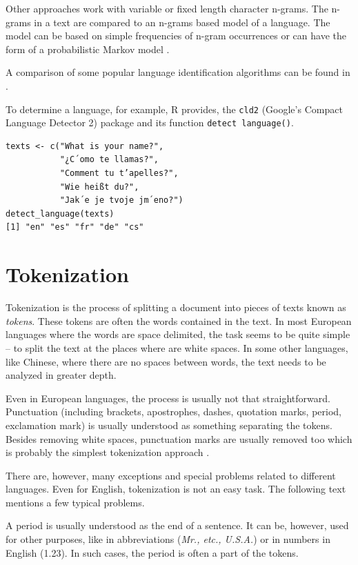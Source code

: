 Other approaches work with variable or fixed length character n-grams. The
n-grams in a text are compared to an n-grams based model of a language. The
model can be based on simple frequencies of n-gram occurrences \cite{ref44} or can
have the form of a probabilistic Markov model \cite{ref215}.

A comparison of some popular language identification algorithms can be
found in \cite{ref131}.

To determine a language, for example, R provides, the \texttt{cld2} (Google’s Compact Language Detector 2) package and its function \texttt{detect language()}.

\begin{verbatim}
texts <- c("What is your name?",
           "¿C´omo te llamas?",
           "Comment tu t’apelles?",
           "Wie heißt du?",
           "Jak´e je tvoje jm´eno?")
detect_language(texts)
[1] "en" "es" "fr" "de" "cs"
\end{verbatim}  

\section{Tokenization}

Tokenization is the process of splitting a document into pieces of texts known as
\textit{tokens}. These tokens are often the words contained in the text. In most European
languages where the words are space delimited, the task seems to be quite simple
– to split the text at the places where are white spaces. In some other languages,
like Chinese, where there are no spaces between words, the text needs to be
analyzed in greater depth.

Even in European languages, the process is usually not that straightforward.
Punctuation (including brackets, apostrophes, dashes, quotation marks, period,
exclamation mark) is usually understood as something separating the tokens. Besides removing white spaces, punctuation marks are usually removed too which
is probably the simplest tokenization approach \cite{ref275, ref211}.

There are, however, many exceptions and special problems related to different languages. Even for English, tokenization is not an easy task. The following
text mentions a few typical problems.

A period is usually understood as the end of a sentence. It can be, however,
used for other purposes, like in abbreviations (\textit{Mr., etc., U.S.A.}) or in numbers in
English (1.23). In such cases, the period is often a part of the tokens.

